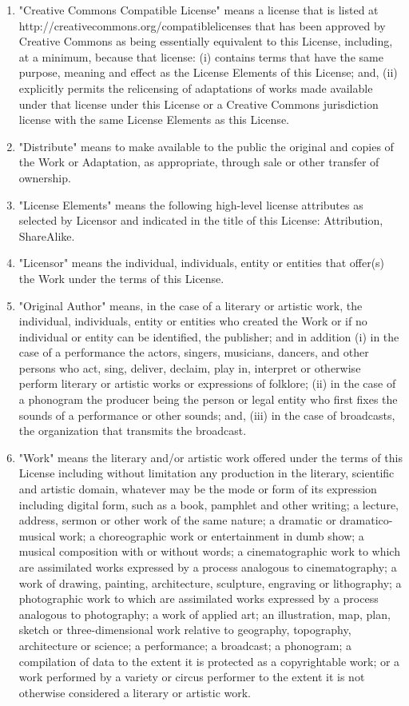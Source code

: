\documentclass{article}
\begin{document}
{\begin{enumerate}
\begin{enumerate}
		\item "Creative Commons Compatible License" means a license that is listed at http://creativecommons.org/compatiblelicenses that has been approved by Creative Commons as being essentially equivalent to this License, including, at a minimum, because that license: (i) contains terms that have the same purpose, meaning and effect as the License Elements of this License; and, (ii) explicitly permits the relicensing of adaptations of works made available under that license under this License or a Creative Commons jurisdiction license with the same License Elements as this License.
		\item "Distribute" means to make available to the public the original and copies of the Work or Adaptation, as appropriate, through sale or other transfer of ownership.
		\item "License Elements" means the following high-level license attributes as selected by Licensor and indicated in the title of this License: Attribution, ShareAlike.
		\item "Licensor" means the individual, individuals, entity or entities that offer(s) the Work under the terms of this License.
		\item "Original Author" means, in the case of a literary or artistic work, the individual, individuals, entity or entities who created the Work or if no individual or entity can be identified, the publisher; and in addition (i) in the case of a performance the actors, singers, musicians, dancers, and other persons who act, sing, deliver, declaim, play in, interpret or otherwise perform literary or artistic works or expressions of folklore; (ii) in the case of a phonogram the producer being the person or legal entity who first fixes the sounds of a performance or other sounds; and, (iii) in the case of broadcasts, the organization that transmits the broadcast.
		\item "Work" means the literary and/or artistic work offered under the terms of this License including without limitation any production in the literary, scientific and artistic domain, whatever may be the mode or form of its expression including digital form, such as a book, pamphlet and other writing; a lecture, address, sermon or other work of the same nature; a dramatic or dramatico-musical work; a choreographic work or entertainment in dumb show; a musical composition with or without words; a cinematographic work to which are assimilated works expressed by a process analogous to cinematography; a work of drawing, painting, architecture, sculpture, engraving or lithography; a photographic work to which are assimilated works expressed by a process analogous to photography; a work of applied art; an illustration, map, plan, sketch or three-dimensional work relative to geography, topography, architecture or science; a performance; a broadcast; a phonogram; a compilation of data to the extent it is protected as a copyrightable work; or a work performed by a variety or circus performer to the extent it is not otherwise considered a literary or artistic work.

\end{enumerate}
\end{enumerate}}
\end{document}

